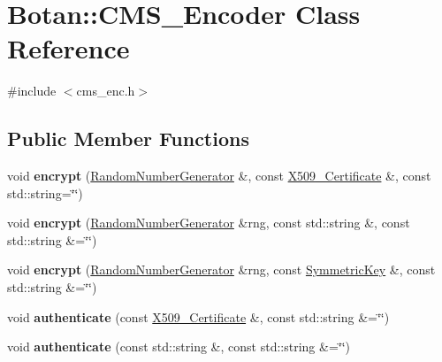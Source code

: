 \hypertarget{classBotan_1_1CMS__Encoder}{\section{Botan\-:\-:C\-M\-S\-\_\-\-Encoder Class Reference}
\label{classBotan_1_1CMS__Encoder}
}


{\ttfamily \#include $<$cms\-\_\-enc.\-h$>$}

\subsection*{Public Member Functions}
\begin{DoxyCompactItemize}
\item 
\hypertarget{classBotan_1_1CMS__Encoder_a76ddf7bfa8ba2e51bbcc2e63f2d22f4e}{void {\bfseries encrypt} (\hyperlink{classBotan_1_1RandomNumberGenerator}{Random\-Number\-Generator} \&, const \hyperlink{classBotan_1_1X509__Certificate}{X509\-\_\-\-Certificate} \&, const std\-::string=\char`\"{}\char`\"{})}\label{classBotan_1_1CMS__Encoder_a76ddf7bfa8ba2e51bbcc2e63f2d22f4e}

\item 
\hypertarget{classBotan_1_1CMS__Encoder_ad6897f6950d4ef435e31df2efa6e251a}{void {\bfseries encrypt} (\hyperlink{classBotan_1_1RandomNumberGenerator}{Random\-Number\-Generator} \&rng, const std\-::string \&, const std\-::string \&=\char`\"{}\char`\"{})}\label{classBotan_1_1CMS__Encoder_ad6897f6950d4ef435e31df2efa6e251a}

\item 
\hypertarget{classBotan_1_1CMS__Encoder_a3da8a6e51265e687f898d815bc79bcf7}{void {\bfseries encrypt} (\hyperlink{classBotan_1_1RandomNumberGenerator}{Random\-Number\-Generator} \&rng, const \hyperlink{namespaceBotan_a00c78597211d5c63b63e2a57ddb96d38}{Symmetric\-Key} \&, const std\-::string \&=\char`\"{}\char`\"{})}\label{classBotan_1_1CMS__Encoder_a3da8a6e51265e687f898d815bc79bcf7}

\item 
\hypertarget{classBotan_1_1CMS__Encoder_af6050d8db5334fd9a71192e1847c8a18}{void {\bfseries authenticate} (const \hyperlink{classBotan_1_1X509__Certificate}{X509\-\_\-\-Certificate} \&, const std\-::string \&=\char`\"{}\char`\"{})}\label{classBotan_1_1CMS__Encoder_af6050d8db5334fd9a71192e1847c8a18}

\item 
\hypertarget{classBotan_1_1CMS__Encoder_a19cf83c172220968aaef8880d3e22062}{void {\bfseries authenticate} (const std\-::string \&, const std\-::string \&=\char`\"{}\char`\"{})}\label{classBotan_1_1CMS__Encoder_a19cf83c172220968aaef8880d3e22062}


\end{DoxyCompactItemize}
